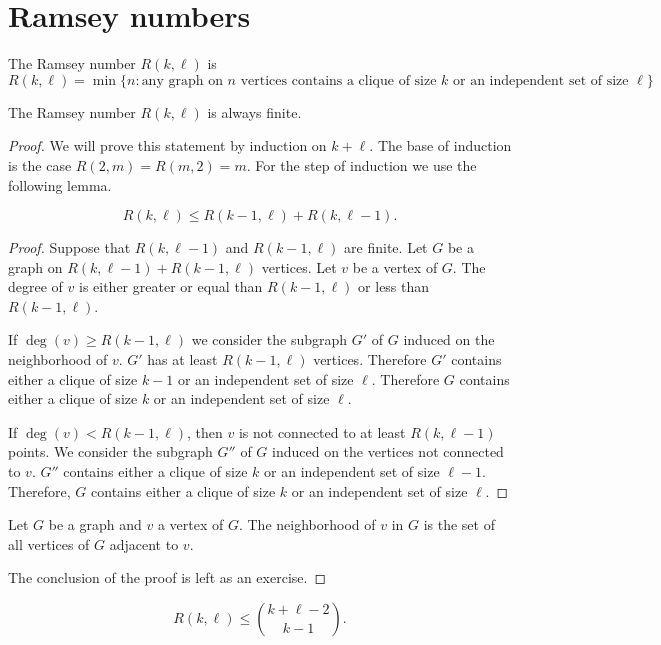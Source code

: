 \section{Ramsey numbers}
\begin{definition}
The Ramsey number $R(k,\ell)$ is 
$$
R(k,\ell)=\min\{ n:\text{any graph on }n \text{ vertices contains a clique of size }k\text{ or an independent set of size }\ell \}
$$
\end{definition}
\begin{theorem}[Ramsey]
The Ramsey number $R(k,\ell)$ is always finite.
\end{theorem}
\begin{proof}
We will prove this statement by induction on $k+\ell$. The base of induction is the case $R(2,m)=R(m,2)=m$. For the step of induction we use the following lemma.
\begin{lemma}
$$
R(k,\ell)\le R(k-1,\ell)+R(k,\ell -1).
$$
\end{lemma}
\begin{proof}
Suppose that $R(k,\ell -1)$ and $R(k-1,\ell)$ are finite. Let $G$ be a graph on $R(k,\ell -1)+R(k-1,\ell)$ vertices. Let $v$ be a vertex of $G$. The degree of $v$ is either greater or equal than $R(k-1,\ell)$ or less than $R(k-1,\ell)$.

If $\deg(v)\ge R(k-1,\ell)$ we consider the subgraph $G'$ of $G$ induced on the neighborhood of $v$. $G'$ has at least $R(k-1,\ell)$ vertices. Therefore $G'$ contains either a clique of size $k-1$ or an independent set of size $\ell$. Therefore $G$ contains either a clique of size $k$ or an independent set of size $\ell$.

If $\deg(v)<R(k-1,\ell)$, then $v$ is not connected to at least $R(k,\ell -1)$ points. We consider the subgraph $G''$ of $G$ induced on the vertices not connected to $v$. $G''$ contains either a clique of size $k$ or an independent set of size $\ell -1$. Therefore, $G$ contains either a clique of size $k$ or an independent set of size $\ell$.
\end{proof}
\begin{definition}
Let $G$ be a graph and $v$ a vertex of $G$. The neighborhood of $v$ in $G$ is the set of all vertices of $G$ adjacent to $v$.
\end{definition}
The conclusion of the proof is left as an exercise.
\end{proof}
\begin{corollary}
$$
R(k,\ell)\le \binom{ k+\ell -2}{k-1 }.
$$
\end{corollary}
